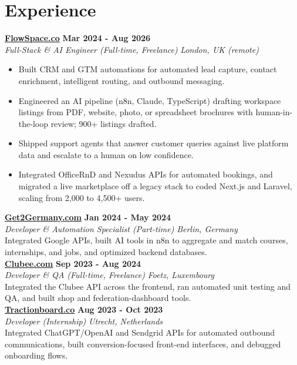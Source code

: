 \documentclass[a4paper,10pt]{article}
\newcommand{\role}[4]{%
 \textbf{#1} \hfill \textbf{#2}\\[1pt]%
 \textit{#3} \hfill \textit{#4}\\[2pt]%
}
\begin{document}
\section{Experience}

\role{\href{https://flowspace.co}{FlowSpace.co}}{Mar 2024 - Aug 2026}{Full-Stack \& AI Engineer (Full-time, Freelance)}{London, UK (remote)}
\begin{itemize}
 \item Built CRM and GTM automations for automated lead capture, contact enrichment, intelligent routing, and outbound messaging.
 \item Engineered an AI pipeline (n8n, Claude, TypeScript) drafting workspace listings from PDF, website, photo, or spreadsheet brochures with human-in-the-loop review; 900+ listings drafted.
 \item Shipped support agents that answer customer queries against live platform data and escalate to a human on low confidence.
 \item Integrated OfficeRnD and Nexudus APIs for automated bookings, and migrated a live marketplace off a legacy stack to coded Next.js and Laravel, scaling from 2,000 to 4,500+ users.
\end{itemize}

\role{\href{https://get2germany.com}{Get2Germany.com}}{Jan 2024 - May 2024}{Developer \& Automation Specialist (Part-time)}{Berlin, Germany}
Integrated Google APIs, built AI tools in n8n to aggregate and match courses, internships, and jobs, and optimized backend databases.\\[1pt]

\role{\href{https://clubee.com}{Clubee.com}}{Sep 2023 - Aug 2024}{Developer \& QA (Full-time, Freelance)}{Foetz, Luxembourg}
Integrated the Clubee API across the frontend, ran automated unit testing and QA, and built shop and federation-dashboard tools.\\[1pt]

\role{\href{https://tractionboard.co}{Tractionboard.co}}{Aug 2023 - Oct 2023}{Developer (Internship)}{Utrecht, Netherlands}
Integrated ChatGPT/OpenAI and Sendgrid APIs for automated outbound communications, built conversion-focused front-end interfaces, and debugged onboarding flows.

\end{document}
